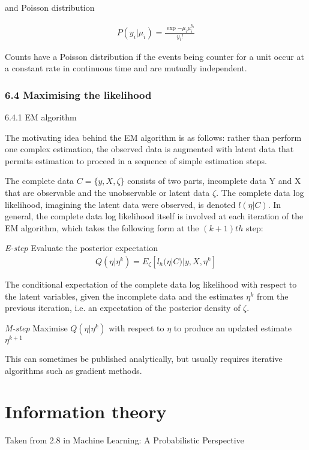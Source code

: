 \documentclass{amsart}
\begin{document}
and Poisson distribution

\begin{align*}
	P(y_i|\mu_i) = \frac{\exp{-\mu_i}\mu_i^{y_i}}{y_i !}
\end{align*}

Counts have a Poisson distribution if the events being counter for a unit occur at a
constant rate in continuous time and are mutually independent.

\subsubsection{6.4 Maximising the likelihood}

6.4.1 EM algorithm

The motivating idea behind the EM algorithm is as follows: rather than perform one complex estimation, the observed data is augmented with latent data that permits estimation to proceed in a sequence of simple estimation steps.
 
The complete data $C=\{y, X, \zeta\}$ consists of two parts,  incomplete data Y and X 
that are observable and the unobservable or latent data $\zeta$. The complete data log 
likelihood, imagining the latent data were observed, is denoted $l(\eta|C)$. In general, 
the complete data log likelihood itself is involved at each iteration of the EM 
algorithm, which takes the following form at the $(k+1)th$ step:

\emph{E-step} Evaluate the posterior expectation
\begin{align*}
	Q(\eta|\eta^k) = E_\zeta [l_h(\eta|C)|y, X, \eta^k]
\end{align*}

The conditional expectation of the complete data log likelihood with respect to the latent variables, given the incomplete data and the estimates $\eta^k$ from the previous iteration, i.e. an expectation of the posterior density of $\zeta$.


\emph{M-step} Maximise $Q(\eta|\eta^k)$ with respect to $\eta$ to produce an updated
estimate $\eta^{k+1}$

This can sometimes be published analytically, but usually requires iterative algorithms 
such as gradient methods.

\section{Information theory}
Taken from 2.8 in Machine Learning: A Probabilistic Perspective
\end{document}
